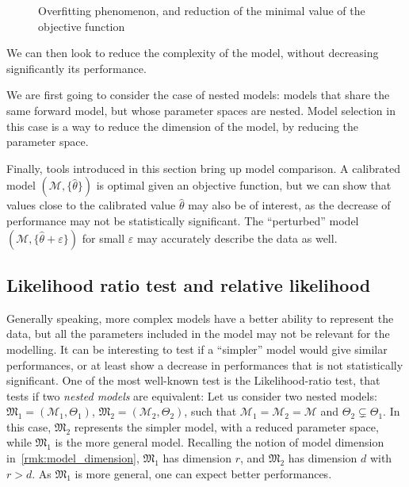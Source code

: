 \documentclass[../../Main_ManuscritThese.tex]{subfiles}
\newcommand\imgpath{/home/victor/acadwriting/Manuscrit/Text/Chapter2/img/}
\begin{document}
\begin{figure}[ht]
  \centering
  
  \caption{\label{fig:overfitting} Overfitting phenomenon, and reduction of the minimal value of the objective function}
\end{figure}


We can then look to reduce the complexity of the model, without decreasing significantly its performance.

We are first going to consider the case of nested models: models that share the same forward model, but whose parameter spaces are nested. Model selection in this case is a way to reduce the dimension of the model, by reducing the parameter space.

Finally, tools introduced in this section bring up model comparison. A calibrated model $(\mathcal{M},\{\hat{\theta}\})$ is optimal given an objective function, but we can show that values close to the calibrated value $\hat{\theta}$ may also be of interest, as the decrease of performance may not be statistically significant. The ``perturbed'' model $(\mathcal{M}, \{\hat{\theta} + \varepsilon\})$ for small $\varepsilon$ may accurately describe the data as well.

\subsection{Likelihood ratio test and relative likelihood}
\label{sec:likelihood_ratio_test}
Generally speaking, more complex models have a better ability to represent the data, but all the parameters included in the model may not be relevant for the modelling. It can be interesting to test if a ``simpler'' model would give similar performances, or at least show a decrease in performances that is not statistically significant.
One of the most well-known test is the Likelihood-ratio test, that tests if two \emph{nested models} are equivalent:
Let us consider two nested models: $\mathfrak{M}_1 = (\mathcal{M}_1, \Theta_1)$, $\mathfrak{M}_2= (\mathcal{M}_2,\Theta_2)$, such that $\mathcal{M}_1=\mathcal{M}_2=\mathcal{M}$ and $\Theta_2 \subsetneq \Theta_1$. In this case, $\mathfrak{M}_2$ represents the simpler model, with a reduced parameter space, while $\mathfrak{M}_1$ is the more general model. Recalling the notion of model dimension in~\cref{rmk:model_dimension},  $\mathfrak{M}_1$ has dimension $r$, and $\mathfrak{M}_2$ has dimension $d$ with $r>d$.
As $\mathfrak{M}_1$ is more general, one can expect better performances.
\end{document}
